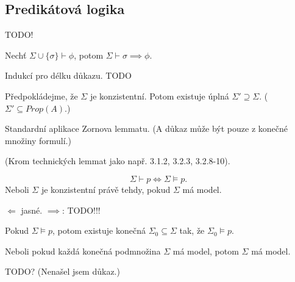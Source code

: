 \documentclass[12pt]{article}                   %
\begin{document}
    \subsection{Predikátová logika}
        \begin{tvrzeni}
            TODO!
        \end{tvrzeni}

        \begin{lemma}[O dedukci]
            Nechť $\Sigma \cup \{\sigma\} \vdash \phi$, potom $\Sigma \vdash \sigma \implies \phi$.

            \begin{dukazin}
                Indukcí pro délku důkazu. TODO
            \end{dukazin}
        \end{lemma}

        \begin{lemma}[Lindenbaum]
            Předpokládejme, že $\Sigma$ je konzistentní. Potom existuje úplná $\Sigma' \supseteq \Sigma$. ($\Sigma' \subseteq Prop(A)$.)

            \begin{dukazin}
                Standardní aplikace Zornova lemmatu. (A důkaz může být pouze z konečné množiny formulí.)
            \end{dukazin}
        \end{lemma}

        \begin{veta}[O úplnosti]
            (Krom technických lemmat jako např. 3.1.2, 3.2.3, 3.2.8-10).

            $$ \Sigma \vdash p \Leftrightarrow \Sigma \models p. $$
            Neboli $\Sigma$ je konzistentní právě tehdy, pokud $\Sigma$ má model.

            \begin{dukazin}
                $\Leftarrow$ jasné. $\implies$: TODO!!! 
            \end{dukazin}
        \end{veta}

        \begin{veta}[O kompaktnosti]
            Pokud $\Sigma \models p$, potom existuje konečná $\Sigma_0 \subseteq \Sigma$ tak, že $\Sigma_0 \models p$.

            Neboli pokud každá konečná podmnožina $\Sigma$ má model, potom $\Sigma$ má model.

            \begin{dukazin}
                TODO? (Nenašel jsem důkaz.)
            \end{dukazin}
        \end{veta}
\end{document}
